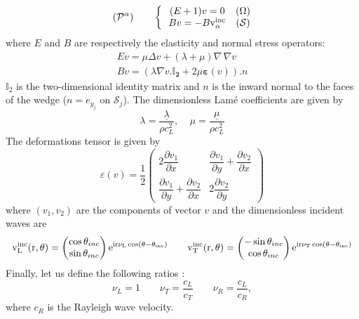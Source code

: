 \begin{equation}
(\mathcal{P}^{\alpha}) \hspace{2em} \left\{~~
\begin{matrix}
(E+1)v=0 & (\Omega) \\
Bv=-B \rm v_{\alpha}^{inc} & (\mathcal{S})
\end{matrix}
\right.
\label{Padim}
\end{equation}
where $E$ and $B$ are respectively the elasticity and normal stress operators:
\begin{gather}
Ev=\mu \Delta v +(\lambda+\mu) \nabla \, \nabla v \label{defE}\\
Bv=(\lambda \nabla v .\mathbf{\mathbb{I}_2}+2\mu \mathbf{\varepsilon} (v)).n\label{defB}
\end{gather}
$\mathbb{I}_2$ is the two-dimensional identity matrix and $n$ is the inward normal to the faces of the wedge ($n=e_{y_j}$ on $\mathcal{S}_j$). The dimensionless Lam\'{e} coefficients are given by
\begin{equation}
\lambda=\frac{\underline{\lambda}}{\rho c_L^2}, \; \; \; \; \mu=\frac{\underline{\mu}}{\rho c_L^2}
\label{LameAdim}
\end{equation}
The deformations tensor is given by 
\begin{equation}
\varepsilon(v)=\dfrac{1}{2}\begin{pmatrix}
2\dfrac{\partial v_1}{\partial x} & \dfrac{\partial v_1}{\partial y}+\dfrac{\partial v_2}{\partial x} \\
\dfrac{\partial v_1}{\partial y}+\dfrac{\partial v_2}{\partial x}& 2\dfrac{\partial v_2}{\partial y}
\end{pmatrix}
\end{equation}
where $(v_1,v_2)$ are the components of vector $v$ and the dimensionless incident waves are
\begin{equation}
\rm v_L^{inc}(r,\theta)=\begin{pmatrix}
\cos \theta_{inc} \\
\sin \theta_{inc}
\end{pmatrix} e^{ir\nu_L \cos(\theta-\theta_{inc})}
\hspace{2em}
\rm v_T^{inc}(r,\theta)=\begin{pmatrix}
-\sin \theta_{inc} \\
\cos \theta_{inc}
\end{pmatrix} e^{ir\nu_T \cos(\theta-\theta_{inc})} 
\label{C3:vinc}
\end{equation}
Finally, let us define the following ratios :
\begin{equation}
\nu_L=1 \hspace{2em} \nu_T=\frac{c_L}{c_T} \hspace{2em} \nu_R=\frac{c_L}{c_R} ,
\label{nuLnuT}
\end{equation}
where $c_R$ is the Rayleigh wave velocity.

